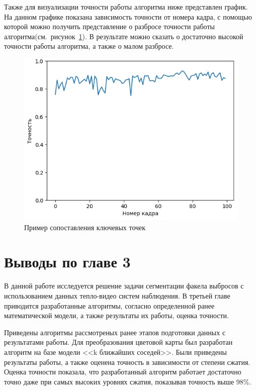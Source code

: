 \documentclass[14pt, a4paper]{extreport}
\begin{document}
	Также для визуализации точности работы алгоритма ниже представлен график. На данном графике показана зависимость точности от номера кадра, с помощью которой можно получить представление о разбросе точности работы алгоритма(см.~рисунок~\ref{fig:accuracy_itog_plot}). В результате можно сказать о достаточно высокой точности работы алгоритма, а также о малом разбросе.\vspace*{-0.6cm}
	\begin{figure}[h!]
		\centering
		\includegraphics[width = \textwidth]{image/chapter_3/accuracy_itog_plot}	
		\caption{Пример сопоставления ключевых точек}
		\label{fig:accuracy_itog_plot}
	\end{figure}
	
\section[Выводы по главе 3]{Выводы по главе 3}	
	В данной работе исследуется решение задачи сегментации факела выбросов с использованием данных тепло-видео систем наблюдения. В третьей главе приводится разработанные алгоритмы, согласно определенной ранее математической модели, а также результаты их работы, оценка точности.
	
	Приведены алгоритмы рассмотреных ранее этапов подготовки данных с результатами работы. Для преобразования цветовой карты был разработан алгоритм на базе модели <<k ближайших соседей>>. Были приведены результаты работы, а также оценена точность в зависимости от степени сжатия. Оценка точности показала, что разработанный алгоритм работает достаточно точно даже при самых высоких уровнях сжатия, показывая точность выше 98\%.
	
\end{document}
